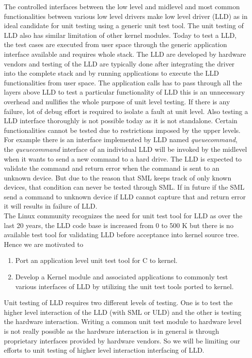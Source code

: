 The controlled interfaces between the low level and midlevel and most common functionalities between various low level drivers make low level driver (LLD) as in ideal candidate for unit testing using a generic unit test tool.  The unit testing of LLD also has similar limitation of other kernel modules.  Today to test a LLD, the test cases are executed from user space through the generic application interface available and requires whole stack. The LLD are developed by hardware vendors and testing of the LLD are typically done after integrating the driver into the complete stack and by running applications to execute the LLD functionalities from user space.  The application calls has to pass through all the layers above LLD to test a particular functionality of LLD this is an unnecessary overhead and nullifies the whole purpose of unit level testing. If there is any failure, lot of debug effort is required to isolate a fault at unit level.  Also testing a LLD interface thoroughly is not possible today as it is not standalone. Certain functionalities cannot be tested due to restrictions imposed by the upper levels.  For example there is an interface implemented by LLD named \textit{queuecommand}, the \textit{queuecommand} interface of an individual LLD will be invoked by the midlevel when it wants to send a new command to a hard drive. The LLD is expected to validate the command and return error when the command is sent to an unknown device.  But due to the reason that SML keeps track of only known devices, that condition can never be tested through SML.  If in future if the SML send a command to unknown device if LLD cannot capture that and return error it will results in failure of LLD.  \\

The Linux community recognizes the need for unit test tool for LLD as over the last 20 years, the    LLD code base is increased from 0 to 500 K but there is no available test tool for validating LLD before acceptance into kernel source tree. \\

Hence we are motivated to 
\begin{enumerate}
\item Port an application level unit test tool for C to kernel. 
\item Develop a Kernel module and associated applications to commonly test various interfaces of LLD by utilizing the unit test tools ported to kernel.
\end{enumerate}

Unit testing of LLD requires two different levels of testing.  One is to test the higher level interaction of the LLD (with SML or ULD) and the other is testing the hardware interaction.  Writing a common unit test module to hardware level is not really possible as the hardware interaction is in general is through proprietary interfaces provided by hardware vendors. So we will be limiting our efforts to unit testing of higher level interaction interfacing of LLD.\\



